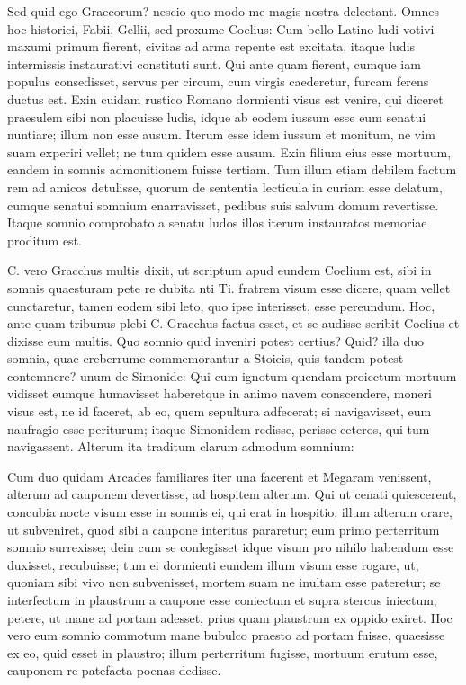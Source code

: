  Sed quid ego Graecorum? nescio quo modo me magis nostra delectant. Omnes hoc historici, Fabii, Gellii, sed proxume Coelius: Cum bello Latino ludi votivi maxumi primum fierent, civitas ad arma repente est excitata, itaque ludis intermissis instaurativi constituti sunt. Qui ante quam fierent, cumque iam populus consedisset, servus per circum, cum virgis caederetur, furcam ferens ductus est. Exin cuidam rustico Romano dormienti visus est venire, qui diceret praesulem sibi non placuisse ludis, idque ab eodem iussum esse eum senatui nuntiare; illum non esse ausum. Iterum esse idem iussum et monitum, ne vim suam experiri vellet; ne tum quidem esse ausum. Exin filium eius esse mortuum, eandem in somnis admonitionem fuisse tertiam. Tum illum etiam debilem factum rem ad amicos detulisse, quorum de sententia lecticula in curiam esse delatum, cumque senatui somnium enarravisset, pedibus suis salvum domum revertisse. Itaque somnio comprobato a senatu ludos illos iterum instauratos memoriae proditum est.

 C. vero Gracchus multis dixit, ut scriptum apud eundem Coelium est, sibi in somnis quaesturam pete re dubita nti Ti. fratrem visum esse dicere, quam vellet cunctaretur, tamen eodem sibi leto, quo ipse interisset, esse pereundum. Hoc, ante quam tribunus plebi C. Gracchus factus esset, et se audisse scribit Coelius et dixisse eum multis. Quo somnio quid inveniri potest certius? Quid? illa duo somnia, quae creberrume commemorantur a Stoicis, quis tandem potest contemnere? unum de Simonide: Qui cum ignotum quendam proiectum mortuum vidisset eumque humavisset haberetque in animo navem conscendere, moneri visus est, ne id faceret, ab eo, quem sepultura adfecerat; si navigavisset, eum naufragio esse periturum; itaque Simonidem redisse, perisse ceteros, qui tum navigassent. Alterum ita traditum clarum admodum somnium:

 Cum duo quidam Arcades familiares iter una facerent et Megaram venissent, alterum ad cauponem devertisse, ad hospitem alterum. Qui ut cenati quiescerent, concubia nocte visum esse in somnis ei, qui erat in hospitio, illum alterum orare, ut subveniret, quod sibi a caupone interitus pararetur; eum primo perterritum somnio surrexisse; dein cum se conlegisset idque visum pro nihilo habendum esse duxisset, recubuisse; tum ei dormienti eundem illum visum esse rogare, ut, quoniam sibi vivo non subvenisset, mortem suam ne inultam esse pateretur; se interfectum in plaustrum a caupone esse coniectum et supra stercus iniectum; petere, ut mane ad portam adesset, prius quam plaustrum ex oppido exiret. Hoc vero eum somnio commotum mane bubulco praesto ad portam fuisse, quaesisse ex eo, quid esset in plaustro; illum perterritum fugisse, mortuum erutum esse, cauponem re patefacta poenas dedisse.

